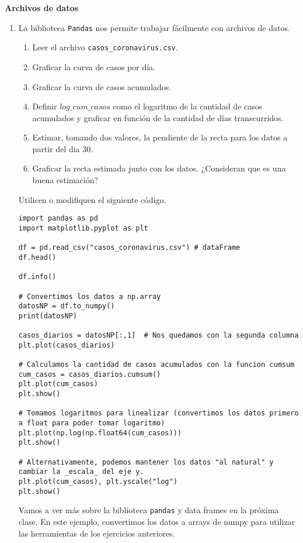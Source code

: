 \documentclass[a4paper,11pt]{article}
\theoremstyle{definition}
\begin{document}
\textbf{\large Archivos de datos}

\begin{enumerate}[resume]
\item La biblioteca \lstinline{Pandas} nos permite trabajar fácilmente con archivos de datos.

\begin{enumerate}
\item Leer el archivo \lstinline{casos_coronavirus.csv}.
\item Graficar la curva de casos por día.
\item Graficar la curva de casos acumulados.
\item Definir $log\_cum\_casos$ como el logaritmo de la cantidad de casos acumulados y graficar en función de la cantidad de días transcurridos.
\item Estimar, tomando dos valores, la pendiente de la recta para los datos a partir del dia 30.
\item Graficar la recta estimada junto con los datos. ¿Consideran que es una buena estimación?
\end{enumerate}

Utilicen o modifiquen el siguiente código.

\begin{lstlisting}
import pandas as pd
import matplotlib.pyplot as plt

df = pd.read_csv("casos_coronavirus.csv") # dataFrame
df.head()

df.info()

# Convertimos los datos a np.array
datosNP = df.to_numpy()
print(datosNP)

casos_diarios = datosNP[:,1]  # Nos quedamos con la segunda columna
plt.plot(casos_diarios)

# Calculamos la cantidad de casos acumulados con la funcion cumsum
cum_casos = casos_diarios.cumsum()
plt.plot(cum_casos)
plt.show()

# Tomamos logaritmos para linealizar (convertimos los datos primero a float para poder tomar logaritmo)
plt.plot(np.log(np.float64(cum_casos)))
plt.show()

# Alternativamente, podemos mantener los datos "al natural" y cambiar la _escala_ del eje y.
plt.plot(cum_casos), plt.yscale("log")
plt.show()
\end{lstlisting}

Vamos a ver más sobre la biblioteca \lstinline{pandas} y data frames en la próxima clase. En este ejemplo, convertimos los datos a arrays de numpy para utilizar las herramientas de los ejercicios anteriores.

\end{enumerate}
\end{document}
